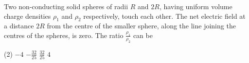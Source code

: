 
\item Two non-conducting solid spheres of radii \( R \) and \( 2R \), having uniform volume charge densities \( \rho_1 \) and \( \rho_2 \) respectively, touch each other. The net electric field at a distance \( 2R \) from the centre of the smaller sphere, along the line joining the centres of the spheres, is zero. The ratio \( \frac{\rho_1}{\rho_2} \) can be
    \begin{tasks}(2)
        \task \( -4 \)
        \task \( -\frac{32}{25} \)
        \task \( \frac{32}{25} \)
        \task \( 4 \)
    \end{tasks}
